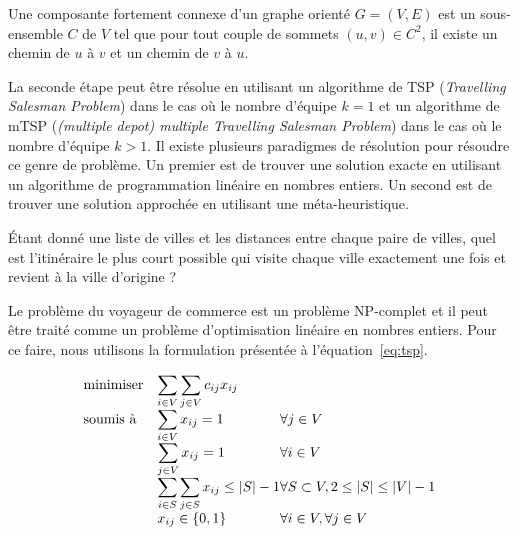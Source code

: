 \documentclass[francais,RandD]{rapportPFE}
\begin{document}
				\begin{Definition}
					\label{def:scc}
					Une composante fortement connexe d'un graphe orienté $G = (V, E)$ est un sous-ensemble $C$ de $V$ tel que pour tout couple de sommets $(u, v) \in C^2$, il existe un chemin de $u$ à $v$ et un chemin de $v$ à $u$.
				\end{Definition}

				La seconde étape peut être résolue en utilisant un algorithme de TSP (\textit{Travelling Salesman Problem}) dans le cas où le nombre d'équipe $k = 1$ et un algorithme de mTSP (\textit{(multiple depot) multiple Travelling Salesman Problem}) dans le cas où le nombre d'équipe $k > 1$.
				Il existe plusieurs paradigmes de résolution pour résoudre ce genre de problème.
				Un premier est de trouver une solution exacte en utilisant un algorithme de programmation linéaire en nombres entiers.
				Un second est de trouver une solution approchée en utilisant une méta-heuristique.

				\begin{Definition}
					\label{def:tsp}
					Étant donné une liste de villes et les distances entre chaque paire de villes, quel est l'itinéraire le plus court possible qui visite chaque ville exactement une fois et revient à la ville d'origine ?
				\end{Definition}

				Le problème du voyageur de commerce est un problème NP-complet et il peut être traité comme un problème d'optimisation linéaire en nombres entiers.
				Pour ce faire, nous utilisons la formulation présentée à l'équation~\ref{eq:tsp}.

				\begin{equation}
					\label{eq:tsp}
					\begin{array}{ll@{}ll}
						\text{minimiser}  & \displaystyle\sum\limits_{i \in V} \sum\limits_{j \in V} c_{ij} x_{ij} \\
						\text{soumis à}   & \displaystyle\sum\limits_{i \in V} x_{ij} = 1 & \forall j \in V\\
						& \displaystyle\sum\limits_{j \in V} x_{ij} = 1 & \forall i \in V\\
						& \displaystyle\sum\limits_{i \in S} \sum\limits_{j \in S} x_{ij} \leq |S| - 1 & \forall S \subset V, 2 \leq |S| \leq |V| - 1\\
						& x_{ij} \in \{0, 1\} & \forall i \in V, \forall j \in V\\
					\end{array}
				\end{equation}
\end{document}

